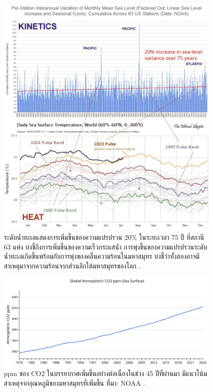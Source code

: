 \documentclass[10pt,twocolumn,letterpaper]{article}
\begin{document}
\begin{figure}[t]
\begin{center}
\includegraphics[width=1\textwidth]{sealevel.jpeg}
\end{center}
   \caption{ระดับน้ำทะเลแสดงการเพิ่มขึ้นของความแปรปรวน 20\% ในระยะเวลา 75 ปี ที่สถานี 63 แห่ง บ่งชี้ถึงการเพิ่มขึ้นของความเร็วกระแสน้ำ การพุ่งขึ้นของความแปรปรวนระดับน้ำทะเลเกิดขึ้นพร้อมกับการพุ่งของคลื่นความร้อนในมหาสมุทร บ่งชี้ว่าทั้งสองอาจมีสาเหตุมาจากความร้อนจากส่วนลึกใต้มหาสมุทรของโลก \cite{2,129}.}
\label{fig:22}
\end{figure}

\begin{figure}[t]
\begin{center}
\includegraphics[width=1\textwidth]{co2.jpg}
\end{center}
   \caption{ppm ของ CO2 ในบรรยากาศเพิ่มขึ้นอย่างต่อเนื่องในช่วง 45 ปีที่ผ่านมา มีแนวโน้มสาเหตุจากอุณหภูมิของมหาสมุทรที่เพิ่มขึ้น ที่มา: NOAA \cite{148,129}.}
\label{fig:23}
\end{figure}
\end{document}
